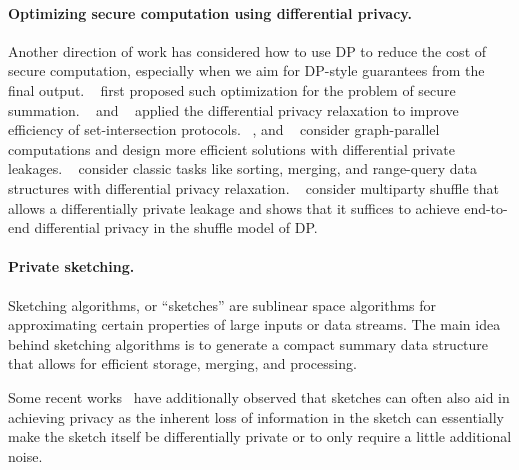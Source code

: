 
\paragraph{Optimizing secure computation using differential privacy.}
Another direction of work has considered how to use DP to reduce the cost of secure computation, especially when we aim for DP-style guarantees from the final output.
~\cite{BNO08} first proposed such optimization for the problem of secure summation. ~\cite{CCS:HMFS17} and ~\cite{PETS:GroRinRos19} applied the differential privacy relaxation to improve efficiency of set-intersection protocols. ~\cite{CCS:MazGor18}, and ~\cite{Usenix:MLRG20} consider graph-parallel computations and design more efficient solutions with differential private leakages. ~\cite{SODA:CCMS19} consider classic tasks like sorting, merging, and range-query data structures with differential privacy relaxation. %
~\cite{ACNS:GKLX22} consider multiparty shuffle that allows a differentially private leakage and shows that it suffices to achieve end-to-end differential privacy in the shuffle model of DP.

\paragraph{Private sketching.}
Sketching algorithms, or ``sketches'' are sublinear space algorithms for
approximating certain properties of large inputs or data streams. The main idea
behind sketching algorithms is to generate a compact summary data structure that
allows for efficient storage, merging, and processing.  

Some recent
works~\cite{FOCS:BBDS12,choi2020differentially,smith2020flajolet,wang2022differentially,ICML:HehTinCor23,dickens2022order,li2019privacy,pagh2022improved,mir2011pan,melis2015efficient,bassily2015local,bassily2017practical,huang2021frequency,zhao2022differentially}
have additionally observed that sketches can often also aid in achieving privacy as the inherent loss of information in the sketch can essentially make the sketch itself be differentially private or to only require a little additional noise. 

